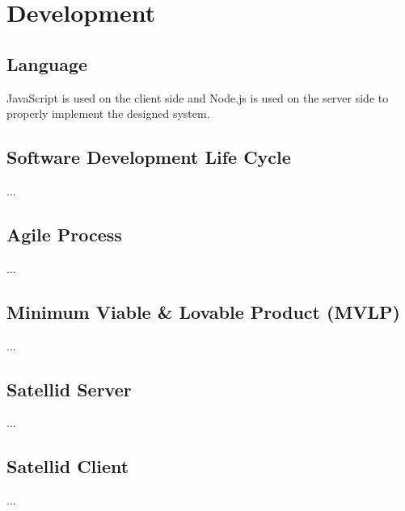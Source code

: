 \section{Development}
\label{sec:development}

\subsection{Language}

JavaScript is used on the client side and Node.js is used on the server side to properly implement the designed system.

\subsection{Software Development Life Cycle}

...

\subsection{Agile Process}

...

\subsection{Minimum Viable \& Lovable Product (MVLP)}

...

\subsection{Satellid Server}

...

\subsection{Satellid Client}

...

